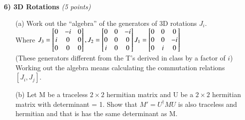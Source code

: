 \textbf{6) 3D Rotations } \hfill \textit{(5 points)}
\begin{itemize}
\item[(a)]Work out the ``algebra'' of the generators of 3D rotations $J_i$. \\
Where $
J_3 =  \begin{bmatrix}    0 & -i & 0  \\ i & 0  & 0 \\ 0 & 0 & 0 \end{bmatrix}, 
\hfill
 J_2 =  \begin{bmatrix}    0 & 0 & -i  \\ 0 & 0  & 0 \\ i & 0 & 0 \end{bmatrix} 
\hfill
 J_1 =  \begin{bmatrix}    0 & 0 & 0  \\ 0 & 0  & -i \\ 0 & i & 0 \end{bmatrix} 
$\\
(These generators different from the T's derived in class by a factor of $i$)\\
Working out the algebra means calculating the commutation relations $[J_i,J_j]$.
\item[(b)]Let M be a traceless $2\times2$ hermitian matrix and U be a $2\times2$  hermitian matrix with determinant = 1.  
Show that $M' = U^{\dagger}MU$ is also traceless and hermitian and that is has the same determinant as M.
\end{itemize}




